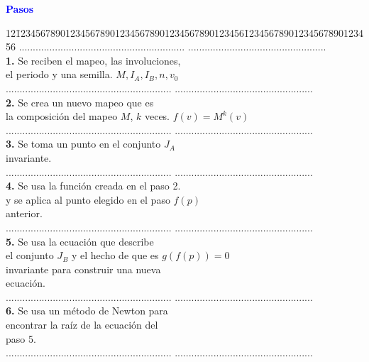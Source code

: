 \begin{center}
	\textcolor{blue}{\textbf{Pasos}}
	\begin{tabbing}
	12\=1234567890123456789012345678901234567890123456\=12345678901234567890123456\kill%
	\>............................................................  \>..................................................\\
	\>\textbf{1.}  Se reciben el mapeo, las involuciones,  \> \\
	\>el periodo y una semilla. \>$M, I_{A}, I_{B},n,v_{0}$ \\
	\>............................................................  \>..................................................\\
	\>\textbf{2.} Se crea un nuevo mapeo que es \> \\
	\> la composición del mapeo $M$, $k$ veces.\>  $f(v)=M^{k}(v)$ \\
	\>............................................................  \>..................................................\\
	\>\textbf{3.} Se toma un punto en el conjunto  \> $J_{A}$\\
	\> invariante. \> \\
	\>............................................................  \>..................................................\\
	\>\textbf{4.} Se usa la función creada en el paso 2. \> \\
	\> y se aplica al punto elegido en el paso \> $f(p)$\\
	\> anterior.\> \\
	\>............................................................  \>..................................................\\
	\>\textbf{5.} Se usa la ecuación que describe \> \\
	\> el conjunto $J_{B}$ y el hecho de que es  \> $g(f(p))=0$\\
	\>invariante para construir una nueva  \> \\
	\> ecuación.\\
	\>............................................................  \>..................................................\\
	\>\textbf{6.}  Se usa un método de Newton para \> \\
	\> encontrar la raíz de la ecuación del \> \\
	\> paso 5.\\
	\>............................................................  \>..................................................\\
	\end{tabbing} 
\end{center}

